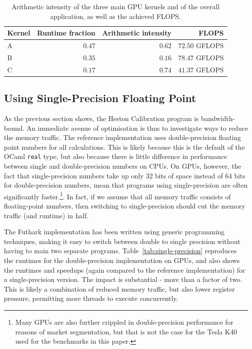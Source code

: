 \documentclass{article}
\begin{document}
\begin{table}
  \centering
  \begin{tabular}{l|r|r|r}
    \textbf{Kernel} & \textbf{Runtime fraction} & \textbf{Arithmetic intensity} & \textbf{FLOPS} \\\hline\hline
    A & $0.47$ & $0.62$ & $72.50$ GFLOPS \\
    B & $0.35$ & $0.16$ & $78.47$ GFLOPS \\
    C & $0.17$ & $0.74$ & $41.37$ GFLOPS \\
  \end{tabular}
  \caption{Arithmetic intensity of the three main GPU kernels and of
    the overall application, as well as the achieved FLOPS.}
  \label{tab:arithmetic-intensity}
\end{table}

\subsection{Using Single-Precision Floating Point}

As the previous section shows, the Heston Calibration program is
bandwidth-bound.  An immediate avenue of optimisation is thus to
investigate ways to reduce the memory traffic.  The reference
implementation uses double-precision floating point numbers for all
calculations.  This is likely because this is the default of the OCaml
\texttt{real} type, but also because there is little difference in
performance between single and double-precision numbers on CPUs.  On
GPUs, however, the fact that single-precision numbers take up only 32
bits of space instead of 64 bits for double-precision numbers, mean
that programs using single-precision are often significantly
faster.\footnote{Many GPUs are also further crippled in
  double-precision performance for reasons of market segmentation, but
  that is not the case for the Tesla K40 used for the benchmarks in
  this paper.}.  In fact, if we assume that all memory traffic
consists of floating-point numbers, then switching to single-precision
should cut the memory traffic (and runtime) in half.

The Futhark implementation has been written using generic programming
techniques, making it easy to switch between double to single
precision without having to main two separate programs.
Table~\ref{tab:single-precision} reproduces the runtimes for the
double-precision implementation on GPUs, and also shows the runtimes
and speedups (again compared to the reference implementation) for a
single-precision version.  The impact is substantial - more than a
factor of two.  This is likely a combination of reduced memory
traffic, but also lower register pressure, permitting more threads to
execute concurrently.
\end{document}

